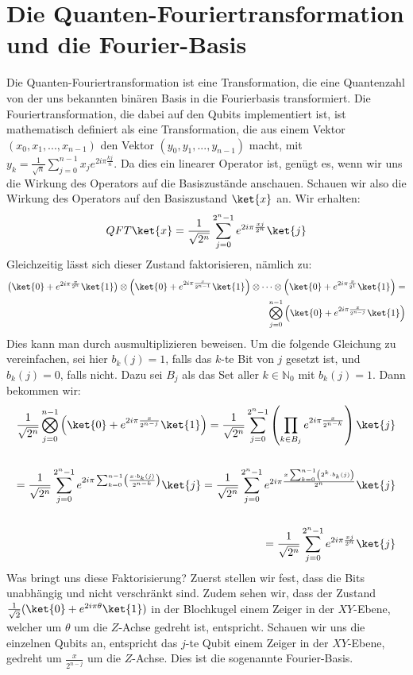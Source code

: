 \section{Die Quanten-Fouriertransformation und die Fourier-Basis}
Die Quanten-Fouriertransformation ist eine Transformation, die eine Quantenzahl von der uns bekannten binären Basis in die Fourierbasis transformiert. Die Fouriertransformation, die dabei auf den Qubits implementiert ist, ist mathematisch definiert als eine Transformation, die aus einem Vektor $(x_0, x_1, ..., x_{n - 1})$ den Vektor $(y_0, y_1, ..., y_{n - 1})$ macht, mit $y_k = \frac{1}{\sqrt{n}}\sum_{j = 0}^{n - 1}x_je^{2i\pi\frac{kj}{n}}$. Da dies ein linearer Operator ist, genügt es, wenn wir uns die Wirkung des Operators auf die Basiszustände anschauen. Schauen wir also die Wirkung des Operators auf den Basiszustand $\ket{x}$ an. Wir erhalten:
$$QFT\ket{x} = \frac{1}{\sqrt{2^n}}\sum^{2^n - 1}_{j = 0}e^{2i\pi\frac{xj}{2^n}}\ket{j}$$
Gleichzeitig lässt sich dieser Zustand faktorisieren, nämlich zu:
\begin{align*}
\left(\ket{0} + e^{2i\pi\frac{x}{2^{n}}}\ket{1}\right)\otimes\left(\ket{0} + e^{2i\pi\frac{x}{2^{n - 1}}}\ket{1}\right)\otimes\cdots\otimes\left(\ket{0} + e^{2i\pi\frac{x}{2^{1}}}\ket{1}\right) = \\ \bigotimes_{j = 0}^{n - 1}\left(\ket{0} + e^{2i\pi\frac{x}{2^{n - j}}}\ket{1}\right)
\end{align*}
Dies kann man durch ausmultiplizieren beweisen. Um die folgende Gleichung zu vereinfachen, sei hier $b_k(j) = 1$, falls das $k$-te Bit von $j$ gesetzt ist, und $b_k(j) = 0$, falls nicht. Dazu sei $B_j$ als das Set aller $k \in \mathbb{N}_0$ mit $b_k(j) = 1$. Dann bekommen wir:
\begin{align*}
\frac{1}{\sqrt{2^n}}\bigotimes_{j = 0}^{n - 1}\left(\ket{0} + e^{2i\pi\frac{x}{2^{n - j}}}\ket{1}\right) = \frac{1}{\sqrt{2^n}}\sum_{j = 0}^{2^n - 1}\left(\prod_{k \in B_j}e^{2i\pi\frac{x}{2^{n - k}}}\right)\ket{j} \\ \\
= \frac{1}{\sqrt{2^n}}\sum_{j = 0}^{2^n - 1}e^{2i\pi\sum_{k = 0}^{n - 1}\left(\frac{x \cdot b_k(j)}{2^{n - k}}\right)}\ket{j} = \frac{1}{\sqrt{2^n}}\sum_{j = 0}^{2^n - 1}e^{2i\pi\frac{x\sum_{k = 0}^{n - 1}\left(2^k\cdot b_k(j)\right)}{2^n}}\ket{j} \\ \\
= \frac{1}{\sqrt{2^n}}\sum_{j = 0}^{2^n - 1}e^{2i\pi\frac{xj}{2^n}}\ket{j}
\end{align*}
Was bringt uns diese Faktorisierung? Zuerst stellen wir fest, dass die Bits unabhängig und nicht verschränkt sind. Zudem sehen wir, dass der Zustand $\frac{1}{\sqrt{2}}(\ket{0} + e^{2i\pi\theta}\ket{1})$ in der Blochkugel einem Zeiger in der $XY$-Ebene, welcher um $\theta$ um die $Z$-Achse gedreht ist, entspricht. Schauen wir uns die einzelnen Qubits an, entspricht das $j$-te Qubit einem Zeiger in der $XY$-Ebene, gedreht um $\frac{x}{2^{n - j}}$ um die $Z$-Achse. Dies ist die sogenannte Fourier-Basis.

